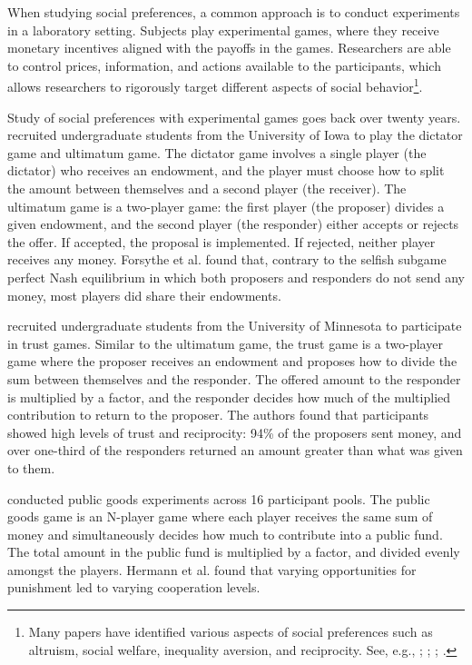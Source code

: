 \documentclass[12pt]{article}
\begin{document}
When studying social preferences, a common approach is to conduct experiments in a laboratory setting. Subjects play experimental games, where they receive monetary incentives aligned with the payoffs in the games. Researchers are able to control prices, information, and actions available to the participants, which allows researchers to rigorously target different aspects of social behavior\footnote{Many papers have identified various aspects of social preferences such as altruism, social welfare, inequality aversion, and reciprocity. See, e.g., \cite{charness_rabin_2002}; \cite{fehr_schmidt_1999}; \cite{rabin_1993}; \cite{fisman_jakiela_kariv_2014}.}.

Study of social preferences with experimental games goes back over twenty years. \cite{forsythe_1994} recruited undergraduate students from the University of Iowa to play the dictator game and ultimatum game. The dictator game involves a single player (the dictator) who receives an endowment, and the player must choose how to split the amount between themselves and a second player (the receiver). The ultimatum game is a two-player game: the first player (the proposer) divides a given endowment, and the second player (the responder) either accepts or rejects the offer. If accepted, the proposal is implemented. If rejected, neither player receives any money. Forsythe et al. found that, contrary to the selfish subgame perfect Nash equilibrium in which both proposers and responders do not send any money, most players did share their endowments.

\cite{berg_1995} recruited undergraduate students from the University of Minnesota to participate in trust games. Similar to the ultimatum game, the trust game is a two-player game where the proposer receives an endowment and proposes how to divide the sum between themselves and the responder. The offered amount to the responder is multiplied by a factor, and the responder decides how much of the multiplied contribution to return to the proposer. The authors found that participants showed high levels of trust and reciprocity: 94\% of the proposers sent money, and over one-third of the responders returned an amount greater than what was given to them.

 \cite{hermann_thoni_gachter_2008} conducted public goods experiments across 16 participant pools. The public goods game is an N-player game where each player receives the same sum of money and simultaneously decides how much to contribute into a public fund. The total amount in the public fund is multiplied by a factor, and divided evenly amongst the players. Hermann et al. found that varying opportunities for punishment led to varying cooperation levels.
\end{document}
